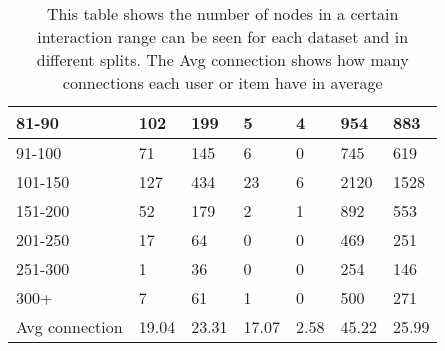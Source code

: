\begin{table*}[]
\begin{tabular}{|l|l|l|l|l|l|l|}
    81-90   & 102           & 199           & 5                  & 4                 & 954             & 883            \\ \hline
    91-100  & 71            & 145           & 6                  & 0                 & 745             & 619            \\ \hline
    101-150 & 127           & 434           & 23                 & 6                 & 2120            & 1528           \\ \hline
    151-200 & 52            & 179           & 2                  & 1                 & 892             & 553            \\ \hline
    201-250 & 17            & 64            & 0                  & 0                 & 469             & 251            \\ \hline
    251-300 & 1             & 36            & 0                  & 0                 & 254             & 146            \\ \hline
    300+    & 7             & 61            & 1                  & 0                 & 500             & 271            \\ \hline
    Avg connection & 19.04         & 23.31         & 17.07              & 2.58             & 45.22           & 25.99          \\ \hline
        \end{tabular}
    \caption{This table shows the number of nodes in a certain interaction range can be seen for each dataset and in different splits. The Avg connection shows how many connections each user or item have in average} %
    \label{tab:dataset-item-and-user-splits}
\end{table*}